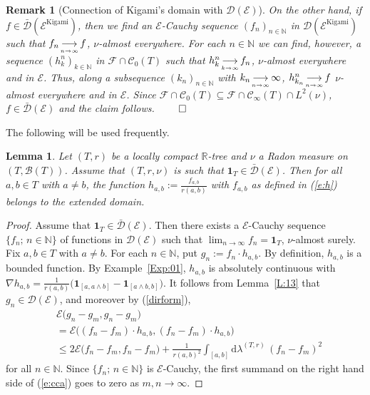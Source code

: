 \documentclass[11pt]{amsart}
\numberwithin{equation}{section}
\newtheorem{lemma}[definition]{Lemma}
\newtheorem{remark}[definition]{Remark}
\begin{document}
{{\begin{remark}[Connection of Kigami's domain with ${\mathcal D}({\mathcal E})$]
On the other hand, if $f\in\bar{{\mathcal D}}({\mathcal E}^{\mathrm{Kigami}})$, then we find an ${\mathcal E}$-Cauchy sequence $(f_n)_{n\in\mathbb{N}}$ in ${\mathcal D}({\mathcal E}^{\mathrm{Kigami}})$
such that $f_n{{_{\displaystyle\longrightarrow\atop n\to\infty}}} f$, $\nu$-almost everywhere. For each $n\in\mathbb{N}$ we can find, however, a sequence $(h^n_{k})_{k\in\mathbb{N}}$ in ${\mathcal F}\cap{\mathcal C}_0(T)$ such that $h^n_{k}{{_{\displaystyle\longrightarrow\atop k\to\infty}}} f_n$,  $\nu$-almost everywhere and in ${\mathcal E}$. Thus, along a subsequence $(k_n)_{n\in\mathbb{N}}$ with $k_n{{_{\displaystyle\longrightarrow\atop n\to\infty}}}\infty$, $h^n_{k_n}{{_{\displaystyle\longrightarrow\atop n\to\infty}}} f$  $\nu$-almost everywhere and in ${\mathcal E}$. Since ${\mathcal F}\cap{\mathcal C}_0(T)\subseteq{\mathcal F}\cap{\mathcal C}_\infty(T)\cap L^2(\nu)$, $f\in\bar{\mathcal D}({\mathcal E})$ and the claim follows.
\label{Rem:05}
\hfill $\qed$
\end{remark}{\smallskip}}

The following will be used frequently.
\begin{lemma} Let $(T,r)$ be a locally compact ${{\mathbb R}}$-tree and $\nu$ a Radon measure on $(T,{\mathcal B}(T))$.
Assume that $(T,r,\nu)$ is such that $\mathbf{1}_T\in\bar{\mathcal D}({\mathcal E})$.
\label{L:08}
Then for all ${a},{b}\in T$ with ${a}\not ={b}$,
the function $h_{{a},{b}}:=\frac{f_{{a},{b}}}{r({a},{b})}$ with $f_{{a},{b}}$ as defined in (\ref{e:h}) belongs to the extended domain.
\end{lemma}{\smallskip}
\begin{proof}  Assume that $\mathbf{1}_T \in \bar{\mathcal D}({\mathcal E})$. Then there exists a
${\mathcal E}$-Cauchy
sequence $\{f_n;\,n\in{{\mathbb N}}\}$ of functions in ${\mathcal D}({\mathcal E})$ such that $\lim_{n\to\infty}f_n=\mathbf{1}_T$, $\nu$-almost surely.
Fix $a,b\in T$ with $a\not=b$.
For each $n\in{{\mathbb N}}$, put
$g_{n}:=f_{n}\cdot h_{{a},{b}}$.
By definition, $h_{{a},{b}}$ is a bounded function.  By Example~\ref{Exp:01}, $h_{{a},{b}}$ is absolutely continuous with
{$\nabla h_{{a},{b}}
 =\frac{1}{r({a},{b})}\big(\mathbf{1}_{[{a},{a}\wedge {b}]}-\mathbf{1}_{[{a}\wedge {b},{b}]}\big)$.}
{It follows from Lemma~\ref{L:13} that} $g_{n}\in\mathcal D(\mathcal E)$, and moreover by (\ref{dirform}),
\begin{equation}
\begin{aligned}
\label{e:cca}
   &{\mathcal E}\big(g_{n}-g_m,g_{n}-g_m\big)
  \\
 &=
   {\mathcal E}\big((f_{n}-f_m)\cdot h_{a,b},(f_{n}-f_m)\cdot h_{a,b}\big)
  \\
 &\le
   {2{\mathcal E}\big(f_{n}-f_m,f_{n}-f_m\big)+\tfrac{1}{r(a,b)^2}\int_{[a,b]}\mathrm{d}\lambda^{(T,r)}\,(f_{n}-f_m)^2}
\end{aligned}
\end{equation}
for all $n\in{{\mathbb N}}$. Since $\{f_n;\,n\in{{\mathbb N}}\}$ is ${\mathcal E}$-Cauchy, the first summand on the right hand side of (\ref{e:cca}) goes to zero as $m,n\rightarrow\infty$.


\end{proof}}
\end{document}
